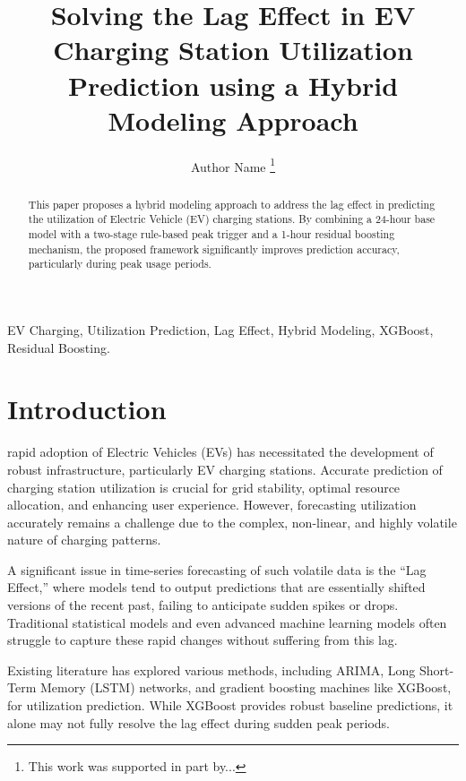 \documentclass[journal]{IEEEtran}
\begin{document}
\title{Solving the Lag Effect in EV Charging Station Utilization Prediction using a Hybrid Modeling Approach}

\author{Author Name
\thanks{This work was supported in part by...}}

\maketitle

\begin{abstract}
This paper proposes a hybrid modeling approach to address the lag effect in predicting the utilization of Electric Vehicle (EV) charging stations. By combining a 24-hour base model with a two-stage rule-based peak trigger and a 1-hour residual boosting mechanism, the proposed framework significantly improves prediction accuracy, particularly during peak usage periods.
\end{abstract}

\begin{IEEEkeywords}
EV Charging, Utilization Prediction, Lag Effect, Hybrid Modeling, XGBoost, Residual Boosting.
\end{IEEEkeywords}

\section{Introduction}
 rapid adoption of Electric Vehicles (EVs) has necessitated the development of robust infrastructure, particularly EV charging stations. Accurate prediction of charging station utilization is crucial for grid stability, optimal resource allocation, and enhancing user experience. However, forecasting utilization accurately remains a challenge due to the complex, non-linear, and highly volatile nature of charging patterns.

A significant issue in time-series forecasting of such volatile data is the ``Lag Effect,'' where models tend to output predictions that are essentially shifted versions of the recent past, failing to anticipate sudden spikes or drops. Traditional statistical models and even advanced machine learning models often struggle to capture these rapid changes without suffering from this lag. 

Existing literature has explored various methods, including ARIMA, Long Short-Term Memory (LSTM) networks, and gradient boosting machines like XGBoost, for utilization prediction. While XGBoost provides robust baseline predictions, it alone may not fully resolve the lag effect during sudden peak periods. 
\end{document}
